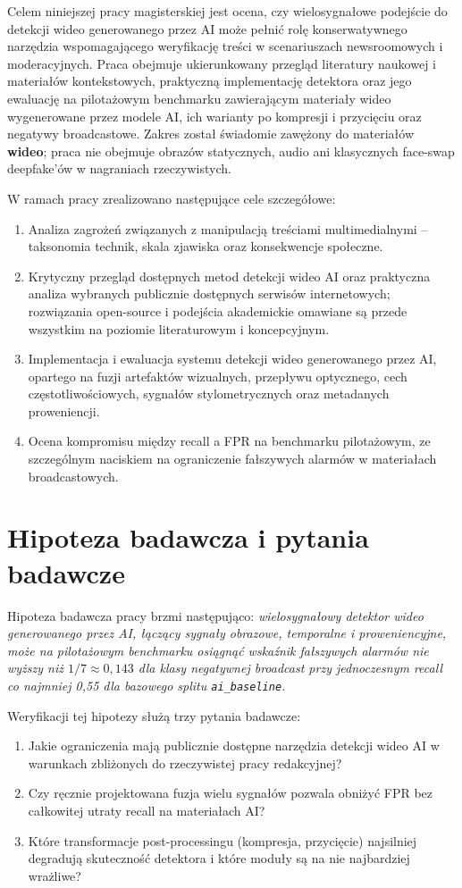 Celem niniejszej pracy magisterskiej jest ocena, czy wielosygnałowe podejście do detekcji wideo generowanego przez AI może pełnić rolę konserwatywnego narzędzia wspomagającego weryfikację treści w scenariuszach newsroomowych i moderacyjnych.
Praca obejmuje ukierunkowany przegląd literatury naukowej i materiałów kontekstowych, praktyczną implementację detektora oraz jego ewaluację na pilotażowym benchmarku zawierającym materiały wideo wygenerowane przez modele AI, ich warianty po kompresji i przycięciu oraz negatywy broadcastowe.
Zakres został świadomie zawężony do materiałów \textbf{wideo}; praca nie obejmuje obrazów statycznych, audio ani klasycznych face-swap deepfake'ów w nagraniach rzeczywistych.

W ramach pracy zrealizowano następujące cele szczegółowe:
\begin{enumerate}
    \item Analiza zagrożeń związanych z manipulacją treściami multimedialnymi -- taksonomia technik, skala zjawiska oraz konsekwencje społeczne.
    \item Krytyczny przegląd dostępnych metod detekcji wideo AI oraz praktyczna analiza wybranych publicznie dostępnych serwisów internetowych; rozwiązania open-source i podejścia akademickie omawiane są przede wszystkim na poziomie literaturowym i koncepcyjnym.
    \item Implementacja i ewaluacja systemu detekcji wideo generowanego przez AI, opartego na fuzji artefaktów wizualnych, przepływu optycznego, cech częstotliwościowych, sygnałów stylometrycznych oraz metadanych proweniencji.
    \item Ocena kompromisu między recall a FPR na benchmarku pilotażowym, ze szczególnym naciskiem na ograniczenie fałszywych alarmów w materiałach broadcastowych.
\end{enumerate}

\section*{Hipoteza badawcza i pytania badawcze}

Hipoteza badawcza pracy brzmi następująco: \textit{wielosygnałowy detektor wideo generowanego przez AI, łączący sygnały obrazowe, temporalne i proweniencyjne, może na pilotażowym benchmarku osiągnąć wskaźnik fałszywych alarmów nie wyższy niż $1/7 \approx 0{,}143$ dla klasy negatywnej broadcast przy jednoczesnym recall co najmniej 0,55 dla bazowego splitu \texttt{ai\_baseline}.}

Weryfikacji tej hipotezy służą trzy pytania badawcze:
\begin{enumerate}
    \item Jakie ograniczenia mają publicznie dostępne narzędzia detekcji wideo AI w warunkach zbliżonych do rzeczywistej pracy redakcyjnej?
    \item Czy ręcznie projektowana fuzja wielu sygnałów pozwala obniżyć FPR bez całkowitej utraty recall na materiałach AI?
    \item Które transformacje post-processingu (kompresja, przycięcie) najsilniej degradują skuteczność detektora i które moduły są na nie najbardziej wrażliwe?
\end{enumerate}

